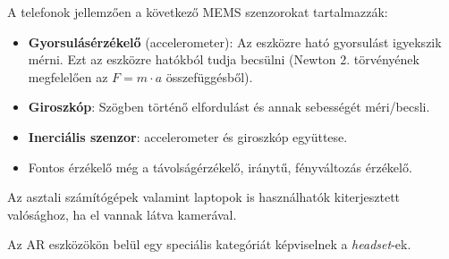 A telefonok jellemzően a következő MEMS szenzorokat tartalmazzák:
\begin{itemize}

\item {\bf Gyorsulásérzékelő} (accelerometer): Az eszközre ható gyorsulást igyekszik mérni. Ezt az eszközre hatókból tudja becsülni (Newton 2. törvényének megfelelően az $F = m \cdot a$ összefüggésből).
\item {\bf Giroszkóp}: Szögben történő elfordulást és annak sebességét méri/becsli.
\item {\bf Inerciális szenzor}: accelerometer és giroszkóp együttese.
\item Fontos érzékelő még a távolságérzékelő, iránytű, fényváltozás érzékelő.
\end{itemize}

Az asztali számítógépek valamint laptopok is használhatók kiterjesztett valósághoz, ha el vannak látva kamerával.


Az AR eszközökön belül egy speciális kategóriát képviselnek a \textit{headset}-ek.

